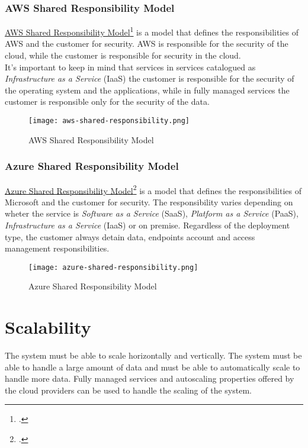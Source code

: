     \newpage
    \subsubsection{AWS Shared Responsibility Model}
    \href{https://aws.amazon.com/it/compliance/shared-responsibility-model/}{AWS Shared Responsibility Model}\footcite{site:aws-shared-responsibility-model} is a model that defines the responsibilities of AWS and the customer for security. AWS is responsible for the security of the cloud, while the customer is responsible for security in the cloud.\\
    It's important to keep in mind that services in services catalogued as \textit{Infrastructure as a Service} (IaaS) the customer is responsible for the security of the operating system and the applications, while in fully managed services the customer is responsible only for the security of the data.\\
    \begin{figure}[htbp]
        \centering
        \texttt{[image: aws-shared-responsibility.png]}
        \caption{AWS Shared Responsibility Model}
    \end{figure}

    \newpage
    \subsubsection{Azure Shared Responsibility Model}
    \href{https://learn.microsoft.com/en-us/azure/security/fundamentals/shared-responsibility}{Azure Shared Responsibility Model}\footcite{site:azure-shared-responsibility-model} is a model that defines the responsibilities of Microsoft and the customer for security. The responsibility varies depending on wheter the service is \textit{Software as a Service} (SaaS), \textit{Platform as a Service} (PaaS), \textit{Infrastructure as a Service} (IaaS) or on premise. Regardless of the deployment type, the customer always detain data, endpoints account and access management responsibilities.\\
    
    \begin{figure}[htbp]
        \centering
        \texttt{[image: azure-shared-responsibility.png]}
        \caption{Azure Shared Responsibility Model}
    \end{figure}

\section{Scalability}
The system must be able to scale horizontally and vertically. The system must be able to handle a large amount of data and must be able to automatically scale to handle more data. Fully managed services and autoscaling properties offered by the cloud providers can be used to handle the scaling of the system.
